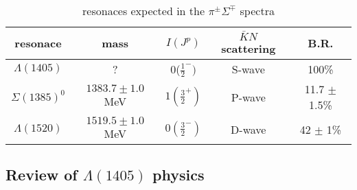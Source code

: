 \begin{table}[]
  \centering  
  \renewcommand\arraystretch{2}
  \caption{resonaces expected in the $\pi^\pm\Sigma^\mp$ spectra}
  \begin{tabular}{ccccc} \hline
  resonace & mass & $I(J^p)$ & $\bar{K}N$ scattering & B.R.\\ \hline\hline
  $\Lambda(1405)$  &  ?     & 0($\frac{1}{2}^-)$  & S-wave & 100\% \\ \hline
  $\Sigma(1385)^0$   & $1383.7 \pm 1.0$ MeV & $1(\frac{3}{2}^+)$ & P-wave & 11.7 $\pm$ 1.5\% \\ \hline
  $\Lambda(1520)$  & $1519.5 \pm 1.0$ MeV & $0(\frac{3}{2}^-)$ & D-wave & 42 $\pm$ 1\% \\ \hline
  \end{tabular}
\end{table}


\subsection{Review of $\Lambda (1405)$ physics}


